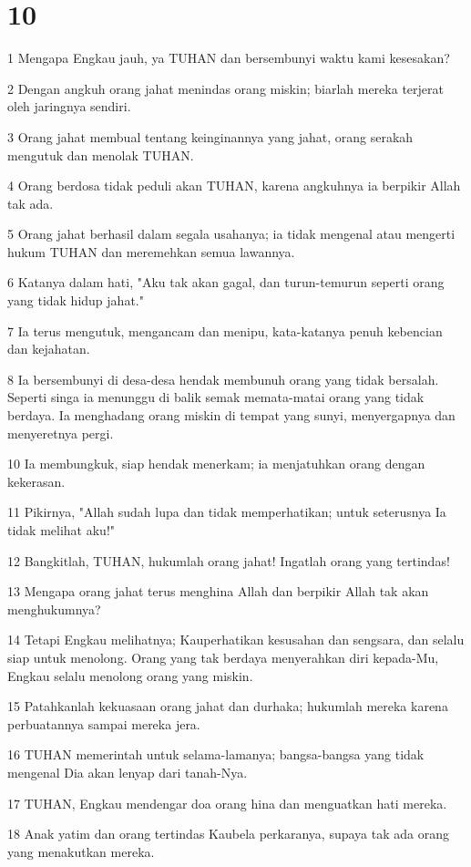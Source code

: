 \chapter{10}

\par 1 Mengapa Engkau jauh, ya TUHAN dan bersembunyi waktu kami kesesakan?
\par 2 Dengan angkuh orang jahat menindas orang miskin; biarlah mereka terjerat oleh jaringnya sendiri.
\par 3 Orang jahat membual tentang keinginannya yang jahat, orang serakah mengutuk dan menolak TUHAN.
\par 4 Orang berdosa tidak peduli akan TUHAN, karena angkuhnya ia berpikir Allah tak ada.
\par 5 Orang jahat berhasil dalam segala usahanya; ia tidak mengenal atau mengerti hukum TUHAN dan meremehkan semua lawannya.
\par 6 Katanya dalam hati, "Aku tak akan gagal, dan turun-temurun seperti orang yang tidak hidup jahat."
\par 7 Ia terus mengutuk, mengancam dan menipu, kata-katanya penuh kebencian dan kejahatan.
\par 8 Ia bersembunyi di desa-desa hendak membunuh orang yang tidak bersalah. Seperti singa ia menunggu di balik semak memata-matai orang yang tidak berdaya. Ia menghadang orang miskin di tempat yang sunyi, menyergapnya dan menyeretnya pergi.
\par 10 Ia membungkuk, siap hendak menerkam; ia menjatuhkan orang dengan kekerasan.
\par 11 Pikirnya, "Allah sudah lupa dan tidak memperhatikan; untuk seterusnya Ia tidak melihat aku!"
\par 12 Bangkitlah, TUHAN, hukumlah orang jahat! Ingatlah orang yang tertindas!
\par 13 Mengapa orang jahat terus menghina Allah dan berpikir Allah tak akan menghukumnya?
\par 14 Tetapi Engkau melihatnya; Kauperhatikan kesusahan dan sengsara, dan selalu siap untuk menolong. Orang yang tak berdaya menyerahkan diri kepada-Mu, Engkau selalu menolong orang yang miskin.
\par 15 Patahkanlah kekuasaan orang jahat dan durhaka; hukumlah mereka karena perbuatannya sampai mereka jera.
\par 16 TUHAN memerintah untuk selama-lamanya; bangsa-bangsa yang tidak mengenal Dia akan lenyap dari tanah-Nya.
\par 17 TUHAN, Engkau mendengar doa orang hina dan menguatkan hati mereka.
\par 18 Anak yatim dan orang tertindas Kaubela perkaranya, supaya tak ada orang yang menakutkan mereka.

